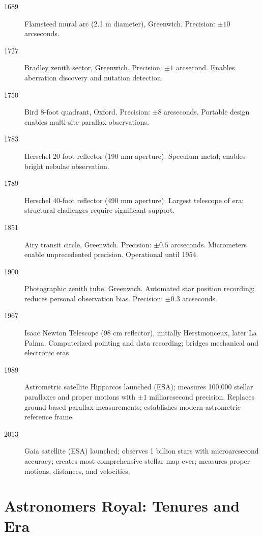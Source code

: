 \begin{description}
\item[1689] Flamsteed mural arc (2.1 m diameter), Greenwich. Precision: $\pm 10$ arcseconds.

\item[1727] Bradley zenith sector, Greenwich. Precision: $\pm 1$ arcsecond. Enables aberration discovery and nutation detection.

\item[1750] Bird 8-foot quadrant, Oxford. Precision: $\pm 8$ arcseconds. Portable design enables multi-site parallax observations.

\item[1783] Herschel 20-foot reflector (190 mm aperture). Speculum metal; enables bright nebulae observation.

\item[1789] Herschel 40-foot reflector (490 mm aperture). Largest telescope of era; structural challenges require significant support.

\item[1851] Airy transit circle, Greenwich. Precision: $\pm 0.5$ arcseconds. Micrometers enable unprecedented precision. Operational until 1954.

\item[1900] Photographic zenith tube, Greenwich. Automated star position recording; reduces personal observation bias. Precision: $\pm 0.3$ arcseconds.

\item[1967] Isaac Newton Telescope (98 cm reflector), initially Herstmonceux, later La Palma. Computerized pointing and data recording; bridges mechanical and electronic eras.

\item[1989] Astrometric satellite Hipparcos launched (ESA); measures 100,000 stellar parallaxes and proper motions with $\pm 1$ milliarcsecond precision. Replaces ground-based parallax measurements; establishes modern astrometric reference frame.

\item[2013] Gaia satellite (ESA) launched; observes 1 billion stars with microarcsecond accuracy; creates most comprehensive stellar map ever; measures proper motions, distances, and velocities.

\end{description}

\section{Astronomers Royal: Tenures and Era}

